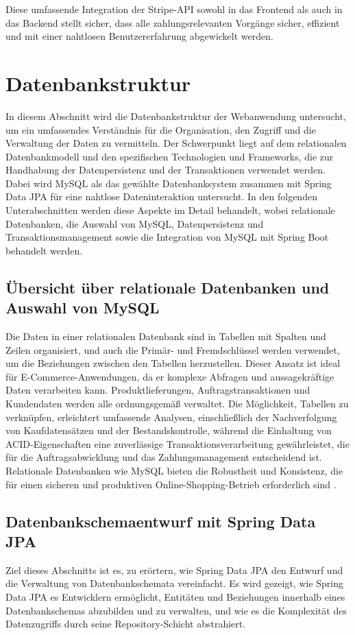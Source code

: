Diese umfassende Integration der Stripe-API sowohl in das Frontend als auch in das Backend stellt sicher, dass alle zahlungsrelevanten Vorgänge sicher, effizient und mit einer nahtlosen Benutzererfahrung abgewickelt werden. 

\section{Datenbankstruktur}
In diesem Abschnitt wird die Datenbankstruktur der Webanwendung untersucht, um ein umfassendes Verständnis für die Organisation, den Zugriff und die Verwaltung der Daten zu vermitteln. Der Schwerpunkt liegt auf dem relationalen Datenbankmodell und den spezifischen Technologien und Frameworks, die zur Handhabung der Datenpersistenz und der Transaktionen verwendet werden. Dabei wird MySQL als das gewählte Datenbanksystem zusammen mit Spring Data JPA für eine nahtlose Dateninteraktion untersucht. In den folgenden Unterabschnitten werden diese Aspekte im Detail behandelt, wobei relationale Datenbanken, die Auswahl von MySQL, Datenpersistenz und Transaktionsmanagement sowie die Integration von MySQL mit Spring Boot behandelt werden.
\subsection{Übersicht über relationale Datenbanken und Auswahl von MySQL}
Die Daten in einer relationalen Datenbank sind in Tabellen mit Spalten und Zeilen organisiert, und auch die Primär- und Fremdschlüssel werden verwendet, um die Beziehungen zwischen den Tabellen herzustellen. Dieser Ansatz ist ideal für E-Commerce-Anwendungen, da er komplexe Abfragen und aussagekräftige Daten verarbeiten kann. Produktlieferungen, Auftragstransaktionen und Kundendaten werden alle ordnungsgemäß verwaltet. Die Möglichkeit, Tabellen zu verknüpfen, erleichtert umfassende Analysen, einschließlich der Nachverfolgung von Kaufdatensätzen und der Bestandskontrolle, während die Einhaltung von ACID-Eigenschaften eine zuverlässige Transaktionsverarbeitung gewährleistet, die für die Auftragsabwicklung und das Zahlungsmanagement entscheidend ist. Relationale Datenbanken wie MySQL bieten die Robustheit und Konsistenz, die für einen sicheren und produktiven Online-Shopping-Betrieb erforderlich sind \cite{IBM:o.J}.

\subsection{Datenbankschemaentwurf mit Spring Data JPA}
Ziel dieses Abschnitts ist es, zu erörtern, wie Spring Data JPA den Entwurf und die Verwaltung von Datenbankschemata vereinfacht. Es wird gezeigt, wie Spring Data JPA es Entwicklern ermöglicht, Entitäten und Beziehungen innerhalb eines Datenbankschemas abzubilden und zu verwalten, und wie es die Komplexität des Datenzugriffs durch seine Repository-Schicht abstrahiert.

